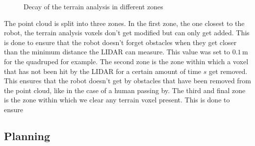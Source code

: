 \documentclass[12pt]{article}
\begin{document}
        \begin{figure}[H]
            \centering
            \caption{Decay of the terrain analysis in different zones}
            \label{fig:decay}
        \end{figure}

        The point cloud is split into three zones. In the first zone, the one closest to the robot, the terrain analysis voxels don't get modified but can only get added. This is done to ensure that the robot doesn't forget obstacles when they get closer than the minimum distance the LIDAR can measure. This value was set to $0.1\,\text{m}$ for the quadruped for example.
        The second zone is the zone within which a voxel that has not been hit by the LIDAR for a certain amount of time $s$ get removed. This ensures that the robot doesn't get by obstacles that have been removed from the point cloud, like in the case of a human passing by. The third and final zone is the zone within which we clear any terrain voxel present. This is done to ensure

    \subsection{Planning}
\end{document}

